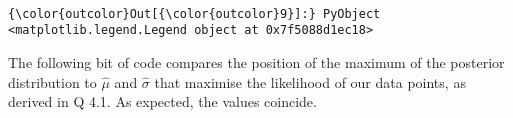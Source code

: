 \documentclass[11pt]{article}
\begin{document}
    \begin{center}
    \end{center}
    { \hspace*{\fill} \\}
    
\begin{Verbatim}[commandchars=\\\{\}]
{\color{outcolor}Out[{\color{outcolor}9}]:} PyObject <matplotlib.legend.Legend object at 0x7f5088d1ec18>
\end{Verbatim}
            
    The following bit of code compares the position of the maximum of the
posterior distribution to \(\hat{μ}\) and \(\hat{σ}\) that maximise the
likelihood of our data points, as derived in Q 4.1. As expected, the
values coincide.
\end{document}
